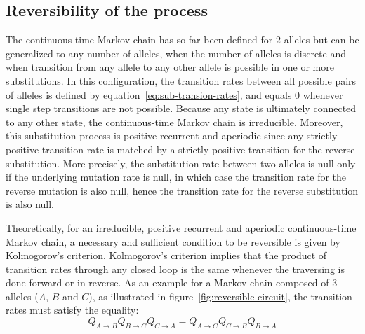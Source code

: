 \subsection{Reversibility of the process}
The continuous-time Markov chain has so far been defined for $2$ alleles but can be generalized to any number of alleles, when the number of alleles is discrete and when transition from any allele to any other allele is possible in one or more substitutions.
In this configuration, the transition rates between all possible pairs of alleles is defined by equation~\ref{eq:sub-transion-rates}, and equals $0$ whenever single step transitions are not possible.
Because any state is ultimately connected to any other state, the continuous-time Markov chain is irreducible.
Moreover, this substitution process is positive recurrent and aperiodic since any strictly positive transition rate is matched by a strictly positive transition for the reverse substitution.
More precisely, the substitution rate between two alleles is null only if the underlying mutation rate is null, in which case the transition rate for the reverse mutation is also null, hence the transition rate for the reverse substitution is also null.

Theoretically, for an irreducible, positive recurrent and aperiodic continuous-time Markov chain, a necessary and sufficient condition to be reversible is given by Kolmogorov's criterion.
Kolmogorov's criterion implies that the product of transition rates through any closed loop is the same whenever the traversing is done forward or in reverse.
As an example for a Markov chain composed of $3$ alleles ($A$, $B$ and $C$), as illustrated in figure~\ref{fig:reversible-circuit}, the transition rates must satisfy the equality:
\begin{equation}
    Q_{A \to B}Q_{B \to C}Q_{C \to A} = Q_{A \to C}Q_{C \to B}Q_{B \to A}
\end{equation}


